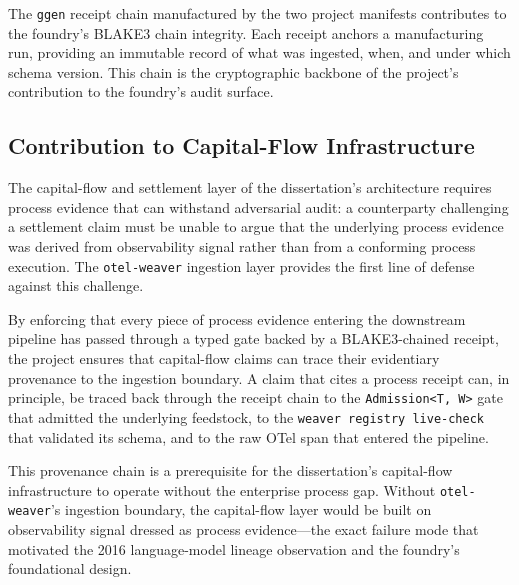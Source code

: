 The \texttt{ggen} receipt chain manufactured by the two project manifests contributes to the
foundry's BLAKE3 chain integrity. Each receipt anchors a manufacturing run, providing an
immutable record of what was ingested, when, and under which schema version. This chain is
the cryptographic backbone of the project's contribution to the foundry's audit surface.

\subsection{Contribution to Capital-Flow Infrastructure}
\label{sec:otel-weaver-contribution-capital}

The capital-flow and settlement layer of the dissertation's architecture requires process evidence
that can withstand adversarial audit: a counterparty challenging a settlement claim must be unable
to argue that the underlying process evidence was derived from observability signal rather than
from a conforming process execution. The \texttt{otel-weaver} ingestion layer provides the
first line of defense against this challenge.

By enforcing that every piece of process evidence entering the downstream pipeline has passed
through a typed gate backed by a BLAKE3-chained receipt, the project ensures that capital-flow
claims can trace their evidentiary provenance to the ingestion boundary. A claim that cites
a process receipt can, in principle, be traced back through the receipt chain to the
\texttt{Admission<T,\,W>} gate that admitted the underlying feedstock, to the
\texttt{weaver registry live-check} that validated its schema, and to the raw OTel span
that entered the pipeline.

This provenance chain is a prerequisite for the dissertation's capital-flow infrastructure
to operate without the enterprise process gap. Without \texttt{otel-weaver}'s ingestion
boundary, the capital-flow layer would be built on observability signal dressed as process
evidence---the exact failure mode that motivated the 2016 language-model lineage observation
and the foundry's foundational design.
